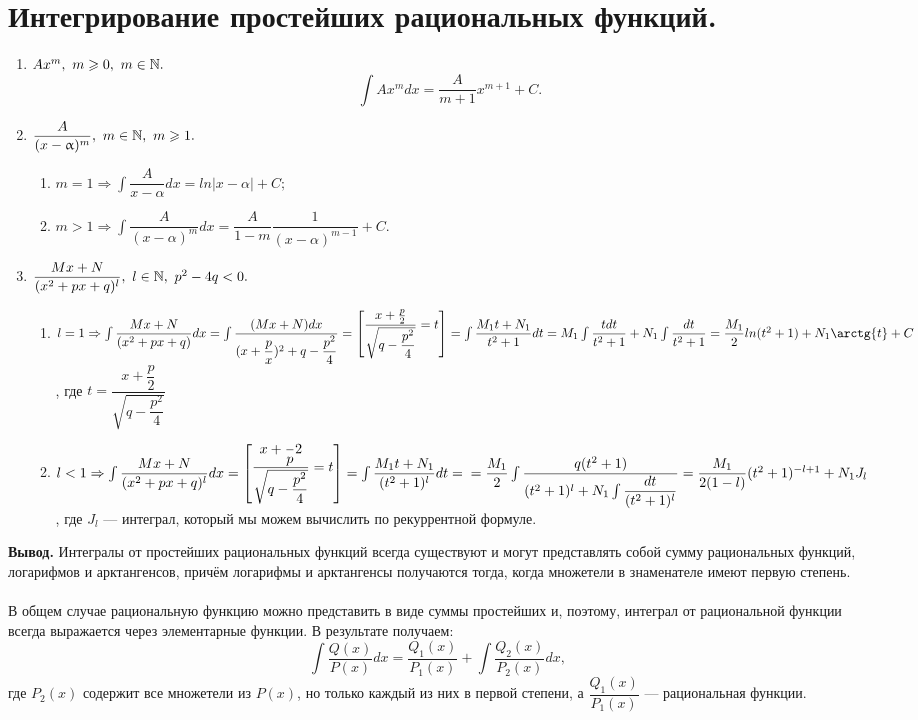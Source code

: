 \section{Интегрирование простейших рациональных функций.}
\begin{enumerate}
	\item $ Ax^m,\ m \geqslant 0,\ m \in {\mathbb{N}}.$
	$$\int\limits Ax^m dx = \frac{A}{m + 1} x^{m + 1} + C.$$
	\item $ \dfrac{A}{(x - \upalpha)^m},\ m \in {\mathbb{N}},\ m \geqslant 1.$
	\begin{enumerate}
		\item $ m = 1\Rightarrow \int\limits \dfrac{A}{x - \alpha} dx = ln|x - \alpha| + C;$
		\item $ m > 1\Rightarrow \int\limits \dfrac{A}{(x - \alpha)^m} dx = \dfrac{A}{1 - m} \dfrac{1}{(x - \alpha)^{m - 1}} + C.$
	\end{enumerate}
	\item $ \dfrac{Mx + N}{(x^2 + px + q)^l},\ l \in {\mathbb{N}},\ p^2 - 4q < 0.$
	\begin{enumerate}
		\item  $ l = 1\Ra \int\limits \dfrac{Mx + N}{(x^2 + px + q)} dx = \int\limits \dfrac{(Mx + N)dx}{(x + \dfrac{p}{x})^2 + q - \dfrac{p^2}{4}} = \begin{bmatrix} \dfrac{x + \frac{p}{2}}{\sqrt{q - \dfrac{p^2}{4}}} = t \end{bmatrix} = \int\limits \dfrac{M_1 t + N_1}{t^2 + 1} dt = M_1 \int\limits \dfrac{tdt}{t^2 + 1} + N_1 \int\limits \dfrac{dt}{t^2 + 1} = \dfrac{M_1}{2} ln(t^2 + 1) + N_1\arctg{t} + C $, где $ t = \dfrac{x + \dfrac{p}{2}}{\sqrt{q - \dfrac{p^2}{4}}} $
		\item $ l < 1\Rightarrow \int\limits \dfrac{Mx + N}{(x^2 + px +q)^l}dx = \begin{bmatrix} \dfrac{x + \dfrac{}p{2}}{\sqrt{q - \dfrac{p^2}{4}}} = t \end{bmatrix} = \int\limits \dfrac{M_1t + N_1}{(t^2 + 1)^l} dt =\\= \dfrac{M_1}{2} \int\limits \dfrac{q(t^2 + 1)}{(t^2 + 1)^l + N_1 \int\limits \dfrac{dt}{(t^2 + 1)^l}} = \dfrac{M_1}{2(1 - l)} (t^2 +1)^{-l + 1} + N_1 J_l$, где $ J_l $ --- интеграл, который мы можем вычислить по рекуррентной формуле.
	\end{enumerate}
\end{enumerate}
\textbf{Вывод.}
Интегралы от простейших рациональных функций всегда существуют и могут представлять собой сумму рациональных функций, логарифмов и арктангенсов, причём логарифмы и арктангенсы получаются тогда, когда множетели в знаменателе имеют первую степень. \\\\
В общем случае рациональную функцию можно представить в виде суммы простейших и, поэтому, интеграл от рациональной функции всегда выражается через элементарные функции. В результате получаем:
$$ \int\limits \frac{Q(x)}{P(x)} dx = \frac{Q_1(x)}{P_1(x)} + \int\limits \frac{Q_2(x)}{P_2(x)} dx, $$
где $ P_2(x)$ содержит все множетели из $P(x)$, но только каждый из них в первой степени, а $\dfrac{Q_1(x)}{P_1(x)} $ --- рациональная функции.

